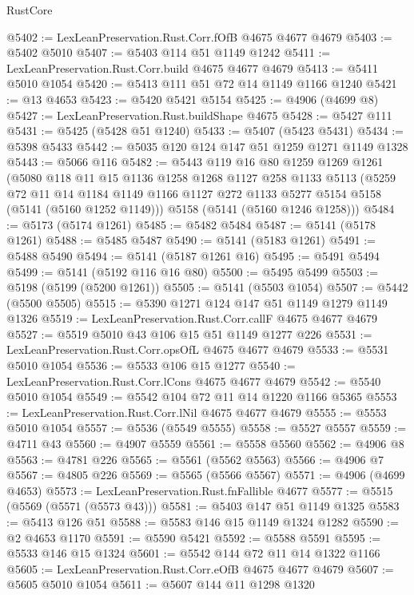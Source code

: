 \begin{lexlean}{RustCore}
\begin{coremodule}
@5402 := LexLeanPreservation.Rust.Corr.fOfB @4675 @4677 @4679
@5403 := @5402 @5010
@5407 := @5403 @114 @51 @1149 @1242
@5411 := LexLeanPreservation.Rust.Corr.build @4675 @4677 @4679
@5413 := @5411 @5010 @1054
@5420 := @5413 @111 @51 @72 @14 @1149 @1166 @1240
@5421 := @13 @4653
@5423 := @5420 @5421 @5154
@5425 := @4906 (@4699 @8)
@5427 := LexLeanPreservation.Rust.buildShape @4675
@5428 := @5427 @111
@5431 := @5425 (@5428 @51 @1240)
@5433 := @5407 (@5423 @5431)
@5434 := @5398 @5433
@5442 := @5035 @120 @124 @147 @51 @1259 @1271 @1149 @1328
@5443 := @5066 @116
@5482 := @5443
    @119
    @16
    @80
    @1259
    @1269
    @1261
    (@5080
      @118
      @11
      @15
      @1136
      @1258
      @1268
      @1127
      @258
      @1133
      @5113
      (@5259
        @72
        @11
        @14
        @1184
        @1149
        @1166
        @1127
        @272
        @1133
        @5277
        @5154
        @5158
        (@5141 (@5160 @1252 @1149)))
      @5158
      (@5141 (@5160 @1246 @1258)))
@5484 := @5173 (@5174 @1261)
@5485 := @5482 @5484
@5487 := @5141 (@5178 @1261)
@5488 := @5485 @5487
@5490 := @5141 (@5183 @1261)
@5491 := @5488 @5490
@5494 := @5141 (@5187 @1261 @16)
@5495 := @5491 @5494
@5499 := @5141 (@5192 @116 @16 @80)
@5500 := @5495 @5499
@5503 := @5198 (@5199 (@5200 @1261))
@5505 := @5141 (@5503 @1054)
@5507 := @5442 (@5500 @5505)
@5515 := @5390 @1271 @124 @147 @51 @1149 @1279 @1149 @1326
@5519 := LexLeanPreservation.Rust.Corr.callF @4675 @4677 @4679
@5527 := @5519 @5010 @43 @106 @15 @51 @1149 @1277 @226
@5531 := LexLeanPreservation.Rust.Corr.opsOfL @4675 @4677 @4679
@5533 := @5531 @5010 @1054
@5536 := @5533 @106 @15 @1277
@5540 := LexLeanPreservation.Rust.Corr.lCons @4675 @4677 @4679
@5542 := @5540 @5010 @1054
@5549 := @5542 @104 @72 @11 @14 @1220 @1166 @5365
@5553 := LexLeanPreservation.Rust.Corr.lNil @4675 @4677 @4679
@5555 := @5553 @5010 @1054
@5557 := @5536 (@5549 @5555)
@5558 := @5527 @5557
@5559 := @4711 @43
@5560 := @4907 @5559
@5561 := @5558 @5560
@5562 := @4906 @8
@5563 := @4781 @226
@5565 := @5561 (@5562 @5563)
@5566 := @4906 @7
@5567 := @4805 @226
@5569 := @5565 (@5566 @5567)
@5571 := @4906 (@4699 @4653)
@5573 := LexLeanPreservation.Rust.fnFallible @4677
@5577 := @5515 (@5569 (@5571 (@5573 @43)))
@5581 := @5403 @147 @51 @1149 @1325
@5583 := @5413 @126 @51
@5588 := @5583 @146 @15 @1149 @1324 @1282
@5590 := @2 @4653 @1170
@5591 := @5590 @5421
@5592 := @5588 @5591
@5595 := @5533 @146 @15 @1324
@5601 := @5542 @144 @72 @11 @14 @1322 @1166
@5605 := LexLeanPreservation.Rust.Corr.eOfB @4675 @4677 @4679
@5607 := @5605 @5010 @1054
@5611 := @5607 @144 @11 @1298 @1320

\end{coremodule}
\end{lexlean}
